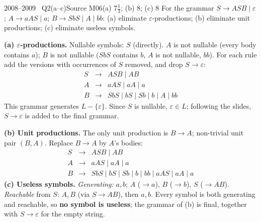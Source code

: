\documentclass[11pt,a4paper]{article}
\newcommand{\eps}{\varepsilon}
\begin{document}
\begin{question}{2008--2009 \textbullet\ Q2(a--c)}{Source M06}{(a) 7$\tfrac13$; (b) 8; (c) 8}
For the grammar $S\to ASB\mid\eps$; $A\to aAS\mid a$; $B\to SbS\mid A\mid bb$: (a) eliminate $\eps$-productions; (b) eliminate unit productions; (c) eliminate useless symbols.
\end{question}
\begin{solution}
\textbf{(a) $\eps$-productions.} Nullable symbols: $S$ (directly). $A$ is not nullable (every body contains $a$); $B$ is not nullable ($SbS$ contains $b$, $A$ is not nullable, $bb$). For each rule add the versions with occurrences of $S$ removed, and drop $S\to\eps$:
\[\begin{array}{rcl}
S&\to&ASB\mid AB\\
A&\to&aAS\mid aA\mid a\\
B&\to&SbS\mid bS\mid Sb\mid b\mid A\mid bb
\end{array}\]
This grammar generates $L-\{\eps\}$. Since $S$ is nullable, $\eps\in L$; following the slides, $S\to\eps$ is added to the final grammar.

\textbf{(b) Unit productions.} The only unit production is $B\to A$; non-trivial unit pair $(B,A)$. Replace $B\to A$ by $A$'s bodies:
\[\begin{array}{rcl}
S&\to&ASB\mid AB\\
A&\to&aAS\mid aA\mid a\\
B&\to&SbS\mid bS\mid Sb\mid b\mid bb\mid aAS\mid aA\mid a
\end{array}\]
\textbf{(c) Useless symbols.} \emph{Generating:} $a,b$; $A$ ($\to a$), $B$ ($\to b$), $S$ ($\to AB$). \emph{Reachable} from $S$: $A,B$ (via $S\to AB$), then $a,b$. Every symbol is both generating and reachable, so \textbf{no symbol is useless}; the grammar of (b) is final, together with $S\to\eps$ for the empty string.
\end{solution}
\end{document}
